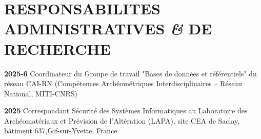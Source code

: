 \documentclass{article}
\newcommand{\fr}[1]{#1}       %
\newcommand{\en}[1]{}     %
\begin{document}
\section*{\fr{RESPONSABILITES ADMINISTRATIVES \textit{\&} DE RECHERCHE}\en{ADMINISTRATIVE \textit{\&} RESEARCH RESPONSABILITIES}}
\smallbreak
\textbf{2025-6}
\fr{Coordinateur du Groupe de travail "Bases de données et référentiels" du réseau CAI-RN (Compétences Archéométriques Interdisciplinaires – Réseau National, MITI-CNRS)}
\en{Coordinator of the "Bases de données et référentiels" Working Group of the CAI-RN network (Interdisciplinary Archaeometric Skills – National Network, MITI-CNRS).}
\smallbreak
\textbf{2025}
\fr{Correspondant Sécurité des Systèmes Informatiques au Laboratoire des Archéomatériaux et Prévision de l'Altération (LAPA), site CEA de Saclay, bâtiment 637,Gif-sur-Yvette, France}
\en{IT Systems Security Correspondent at the Laboratory for Archaeomaterials and Alteration Forecasting (LAPA), CEA Saclay site, Building 637, Gif-sur-Yvette, France.}
\end{document}
